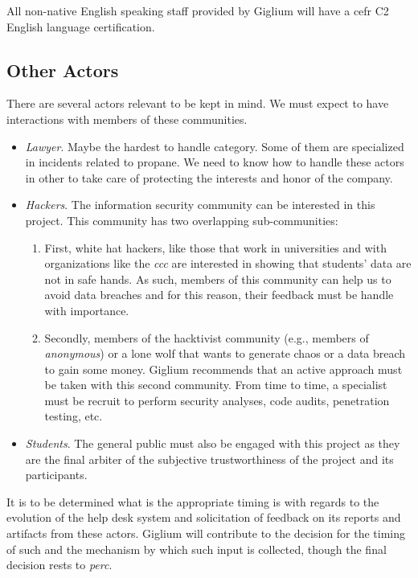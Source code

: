 \begin{tcolorbox}
	All non-native English speaking staff provided by Giglium will have a \gls{cefr} C2 English language certification.
\end{tcolorbox}

\subsection{Other Actors}
There are several actors relevant to be kept in mind. We must expect to have interactions
with members of these communities.
\begin{itemize}
	\item \textit{Lawyer}. Maybe the hardest to handle category. Some of them are specialized in incidents related to propane. We need to know how to handle these actors in other to take care of protecting the interests and honor of the company.
	\item \textit{Hackers}. The information security community can be interested in this project. This community has two overlapping sub-communities:
	\begin{enumerate}
		\item First, white hat hackers, like those that work in universities and with organizations like the
		\textit{\gls{ccc}} are interested in showing that students' data are not in safe hands.
		As such, members of this community can help us to avoid data breaches and for this reason, their feedback must be handle with importance. 
		\item Secondly, members of the hacktivist community (e.g., members of
		\textit{\gls{anonymous}}) or a lone wolf that wants to generate chaos or a data breach to gain some money.
		Giglium recommends that an active approach must be taken with this second community.
		From time to time, a specialist must be recruit to perform security analyses, code audits, penetration testing,
		etc.
	\end{enumerate}
	
	\item \textit{Students}. The general public must also be engaged with this project as they are the final arbiter of the subjective trustworthiness of the project and its participants.
\end{itemize}

It is to be determined what is the appropriate timing is with regards to the evolution of the help desk system and solicitation of feedback on its reports and artifacts from these actors. Giglium will contribute to the decision for the timing of
such and the mechanism by which such input is collected, though the final decision rests to \textit{\gls{perc}}.

